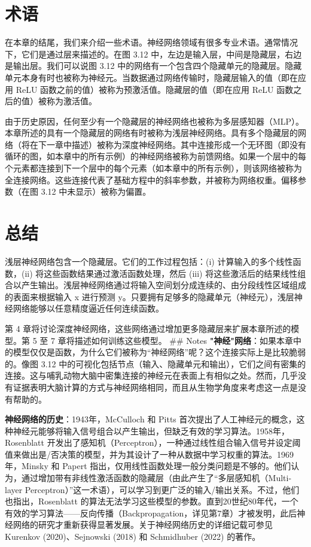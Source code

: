 \section{术语}
在本章的结尾，我们来介绍一些术语。神经网络领域有很多专业术语。通常情况下，它们是通过层来描述的。在图 3.12 中，左边是输入层，中间是隐藏层，右边是输出层。我们可以说图 3.12 中的网络有一个包含四个隐藏单元的隐藏层。隐藏单元本身有时也被称为神经元。当数据通过网络传输时，隐藏层输入的值（即在应用 ReLU 函数之前的值）被称为预激活值。隐藏层的值（即在应用 ReLU 函数之后的值）被称为激活值。

由于历史原因，任何至少有一个隐藏层的神经网络也被称为多层感知器（MLP）。本章所述的具有一个隐藏层的网络有时被称为浅层神经网络。具有多个隐藏层的网络（将在下一章中描述）被称为深度神经网络。其中连接形成一个无环图（即没有循环的图，如本章中的所有示例）的神经网络被称为前馈网络。如果一个层中的每个元素都连接到下一个层中的每个元素（如本章中的所有示例），则该网络被称为全连接网络。这些连接代表了基础方程中的斜率参数，并被称为网络权重。偏移参数（在图 3.12 中未显示）被称为偏置。

\section{总结}
浅层神经网络包含一个隐藏层。它们的工作过程包括：(i) 计算输入的多个线性函数，(ii) 将这些函数结果通过激活函数处理，然后 (iii) 将这些激活后的结果线性组合以产生输出。浅层神经网络通过将输入空间划分成连续的、由分段线性区域组成的表面来根据输入 x 进行预测 y。只要拥有足够多的隐藏单元（神经元），浅层神经网络能够以任意精度逼近任何连续函数。

第 4 章将讨论深度神经网络，这些网络通过增加更多隐藏层来扩展本章所述的模型。第 5 至 7 章将描述如何训练这些模型。
## Notes
\textbf{"神经"网络}：如果本章中的模型仅仅是函数，为什么它们被称为“神经网络”呢？这个连接实际上是比较脆弱的。像图 3.12 中的可视化包括节点（输入、隐藏单元和输出），它们之间有密集的连接。这与哺乳动物大脑中密集连接的神经元在表面上有相似之处。然而，几乎没有证据表明大脑计算的方式与神经网络相同，而且从生物学角度来考虑这一点是没有帮助的。


\textbf{神经网络的历史}：1943年，McCulloch 和 Pitts 首次提出了人工神经元的概念，这种神经元能够将输入信号组合以产生输出，但缺乏有效的学习算法。1958年，Rosenblatt 开发出了感知机（Perceptron），一种通过线性组合输入信号并设定阈值来做出是/否决策的模型，并为其设计了一种从数据中学习权重的算法。1969年，Minsky 和 Papert 指出，仅用线性函数处理一般分类问题是不够的。他们认为，通过增加带有非线性激活函数的隐藏层（由此产生了“多层感知机（Multi-layer Perceptron）”这一术语），可以学习到更广泛的输入/输出关系。不过，他们也指出，Rosenblatt 的算法无法学习这些模型的参数。直到20世纪80年代，一个有效的学习算法——反向传播（Backpropagation，详见第7章）才被发明，此后神经网络的研究才重新获得显著发展。关于神经网络历史的详细记载可参见 Kurenkov (2020)、Sejnowski (2018) 和 Schmidhuber (2022) 的著作。

